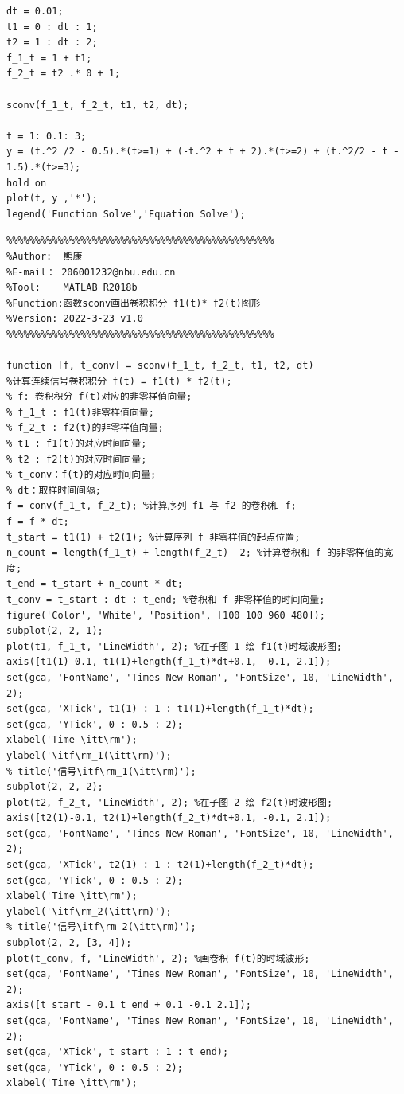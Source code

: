\documentclass[UTF8,AutoFakeBold]{ctexart}
\begin{document}
\begin{enumerate}
\begin{enumerate}
\begin{lstlisting}
dt = 0.01;
t1 = 0 : dt : 1;
t2 = 1 : dt : 2;
f_1_t = 1 + t1;
f_2_t = t2 .* 0 + 1;
	
sconv(f_1_t, f_2_t, t1, t2, dt);

t = 1: 0.1: 3;
y = (t.^2 /2 - 0.5).*(t>=1) + (-t.^2 + t + 2).*(t>=2) + (t.^2/2 - t - 1.5).*(t>=3);
hold on
plot(t, y ,'*');
legend('Function Solve','Equation Solve');
				\end{lstlisting}

				\begin{lstlisting}
%%%%%%%%%%%%%%%%%%%%%%%%%%%%%%%%%%%%%%%%%%%%%%% 
%Author:  熊康
%E-mail： 206001232@nbu.edu.cn
%Tool:    MATLAB R2018b
%Function:函数sconv画出卷积积分 f1(t)* f2(t)图形
%Version: 2022-3-23 v1.0
%%%%%%%%%%%%%%%%%%%%%%%%%%%%%%%%%%%%%%%%%%%%%%%

function [f, t_conv] = sconv(f_1_t, f_2_t, t1, t2, dt)
%计算连续信号卷积积分 f(t) = f1(t) * f2(t);
% f: 卷积积分 f(t)对应的非零样值向量;
% f_1_t : f1(t)非零样值向量;
% f_2_t : f2(t)的非零样值向量;
% t1 : f1(t)的对应时间向量;
% t2 : f2(t)的对应时间向量;
% t_conv：f(t)的对应时间向量;
% dt：取样时间间隔;
f = conv(f_1_t, f_2_t); %计算序列 f1 与 f2 的卷积和 f;
f = f * dt;
t_start = t1(1) + t2(1); %计算序列 f 非零样值的起点位置;
n_count = length(f_1_t) + length(f_2_t)- 2; %计算卷积和 f 的非零样值的宽度;
t_end = t_start + n_count * dt;
t_conv = t_start : dt : t_end; %卷积和 f 非零样值的时间向量;
figure('Color', 'White', 'Position', [100 100 960 480]);
subplot(2, 2, 1);
plot(t1, f_1_t, 'LineWidth', 2); %在子图 1 绘 f1(t)时域波形图;
axis([t1(1)-0.1, t1(1)+length(f_1_t)*dt+0.1, -0.1, 2.1]);
set(gca, 'FontName', 'Times New Roman', 'FontSize', 10, 'LineWidth', 2);
set(gca, 'XTick', t1(1) : 1 : t1(1)+length(f_1_t)*dt);
set(gca, 'YTick', 0 : 0.5 : 2);
xlabel('Time \itt\rm');
ylabel('\itf\rm_1(\itt\rm)');
% title('信号\itf\rm_1(\itt\rm)');
subplot(2, 2, 2);
plot(t2, f_2_t, 'LineWidth', 2); %在子图 2 绘 f2(t)时波形图;
axis([t2(1)-0.1, t2(1)+length(f_2_t)*dt+0.1, -0.1, 2.1]);
set(gca, 'FontName', 'Times New Roman', 'FontSize', 10, 'LineWidth', 2);
set(gca, 'XTick', t2(1) : 1 : t2(1)+length(f_2_t)*dt);
set(gca, 'YTick', 0 : 0.5 : 2);
xlabel('Time \itt\rm');
ylabel('\itf\rm_2(\itt\rm)');
% title('信号\itf\rm_2(\itt\rm)');
subplot(2, 2, [3, 4]);
plot(t_conv, f, 'LineWidth', 2); %画卷积 f(t)的时域波形;
set(gca, 'FontName', 'Times New Roman', 'FontSize', 10, 'LineWidth', 2);
axis([t_start - 0.1 t_end + 0.1 -0.1 2.1]);
set(gca, 'FontName', 'Times New Roman', 'FontSize', 10, 'LineWidth', 2);
set(gca, 'XTick', t_start : 1 : t_end);
set(gca, 'YTick', 0 : 0.5 : 2);
xlabel('Time \itt\rm');

\end{lstlisting}
\end{enumerate}
\end{enumerate}
\end{document}
